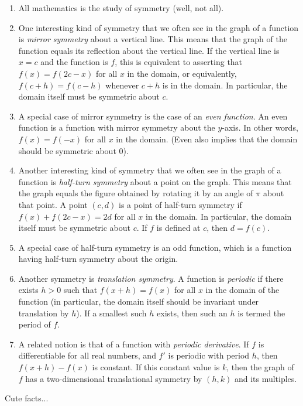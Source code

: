 \documentclass[10pt]{amsart}
\begin{document}
\begin{enumerate}
\item All mathematics is the study of symmetry (well, not all).
\item One interesting kind of symmetry that we often see in the graph
  of a function is {\em mirror symmetry} about a vertical line. This
  means that the graph of the function equals its reflection about the
  vertical line. If the vertical line is $x = c$ and the function is
  $f$, this is equivalent to asserting that $f(x) = f(2c - x)$ for all
  $x$ in the domain, or equivalently, $f(c + h) = f(c - h)$ whenever
  $c + h$ is in the domain. In particular, the domain itself must be
  symmetric about $c$.
\item A special case of mirror symmetry is the case of an {\em even
  function}. An even function is a function with mirror symmetry about
  the $y$-axis. In other words, $f(x) = f(-x)$ for all $x$ in the
  domain. (Even also implies that the domain should be symmetric about $0$).
\item Another interesting kind of symmetry that we often see in the
  graph of a function is {\em half-turn symmetry} about a point on the
  graph. This means that the graph equals the figure obtained by
  rotating it by an angle of $\pi$ about that point. A point $(c,d)$
  is a point of half-turn symmetry if $f(x) + f(2c - x) = 2d$ for all
  $x$ in the domain. In particular, the domain itself must be
  symmetric about $c$. If $f$ is defined at $c$, then $d = f(c)$.
\item A special case of half-turn symmetry is an odd function, which
  is a function having half-turn symmetry about the origin.
\item Another symmetry is {\em translation symmetry}. A function is
  {\em periodic} if there exists $h > 0$ such that $f(x + h) = f(x)$
  for all $x$ in the domain of the function (in particular, the domain
  itself should be invariant under translation by $h$). If a smallest
  such $h$ exists, then such an $h$ is termed the period of $f$.
\item A related notion is that of a function with {\em periodic
  derivative}. If $f$ is differentiable for all real numbers, and $f'$
  is periodic with period $h$, then $f(x + h) - f(x)$ is constant. If
  this constant value is $k$, then the graph of $f$ has a
  two-dimensional translational symmetry by $(h,k)$ and its multiples.
\end{enumerate}

Cute facts...
\end{document}
